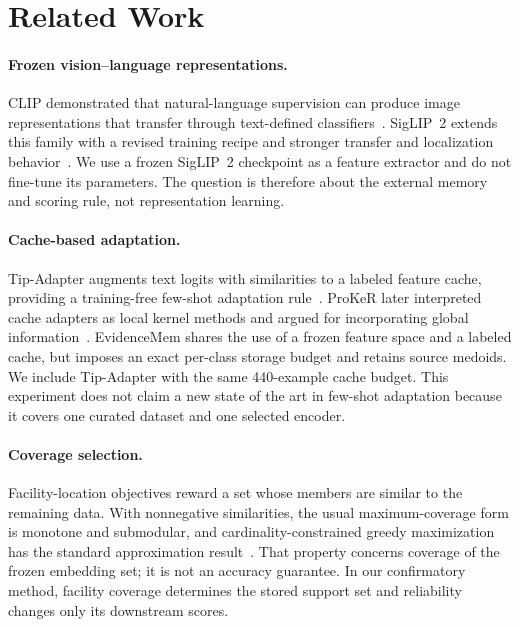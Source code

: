 \documentclass[10pt,twocolumn]{article}
\newcommand{\method}{EvidenceMem}
\begin{document}
\section{Related Work}

\paragraph{Frozen vision--language representations.}
CLIP demonstrated that natural-language supervision can produce image representations
that transfer through text-defined classifiers~\cite{radford2021learning}. SigLIP~2
extends this family with a revised training recipe and stronger transfer and localization
behavior~\cite{tschannen2025siglip2}. We use a frozen SigLIP~2 checkpoint as a feature
extractor and do not fine-tune its parameters. The question is therefore about the
external memory and scoring rule, not representation learning.

\paragraph{Cache-based adaptation.}
Tip-Adapter augments text logits with similarities to a labeled feature cache, providing
a training-free few-shot adaptation rule~\cite{zhang2022tipadapter}. ProKeR later
interpreted cache adapters as local kernel methods and argued for incorporating global
information~\cite{bendou2025proker}. \method{} shares the use of a frozen feature space
and a labeled cache, but imposes an exact per-class storage budget and retains source
medoids. We include Tip-Adapter with the same 440-example cache budget. This experiment
does not claim a new state of the art in few-shot adaptation because it covers one
curated dataset and one selected encoder.

\paragraph{Coverage selection.}
Facility-location objectives reward a set whose members are similar to the remaining
data. With nonnegative similarities, the usual maximum-coverage form is monotone and
submodular, and cardinality-constrained greedy maximization has the standard
approximation result~\cite{nemhauser1978analysis}. That property concerns coverage of
the frozen embedding set; it is not an accuracy guarantee. In our confirmatory method,
facility coverage determines the stored support set and reliability changes only its
downstream scores.
\end{document}
